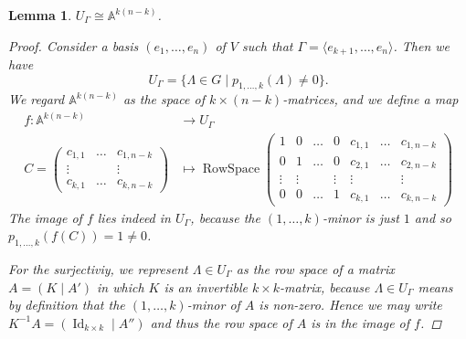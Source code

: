 \documentclass[12pt,a4paper]{amsart}
\theoremstyle{plain}
\newtheorem{lm}[thm]{Lemma}
\theoremstyle{definition}
\theoremstyle{remark}
\begin{document}
\begin{lm}
    $U_{\Gamma}\cong \mathbb{A}^{k(n-k)}$.
    \begin{proof}
	Consider a basis $(e_{1},\ldots,e_{n})$ of $V$ such that $\Gamma=\langle e_{k+1},\ldots,e_{n}\rangle$.
	Then we have
	\[ U_{\Gamma}=\{ \Lambda\in G\mid p_{1,\ldots,k}(\Lambda)\neq 0\}. \]
	We regard $\mathbb{A}^{k(n-k)}$ as the space of $k\times (n-k)$-matrices, and we define a map
	\begin{align*}
	    f\colon \mathbb{A}^{k(n-k)} & \longrightarrow U_{\Gamma} \\
	    C=\begin{pmatrix}
		c_{1,1} & \ldots & c_{1,n-k} \\
		\vdots & & \vdots \\
		c_{k,1} & \ldots & c_{k,n-k}
	    \end{pmatrix}
	    & \longmapsto \operatorname{RowSpace}\begin{pmatrix}
		1 & 0 & \ldots & 0 & c_{1,1} & \ldots & c_{1,n-k} \\
		0 & 1 & \ldots & 0 & c_{2,1} & \ldots & c_{2,n-k} \\
		\vdots & \vdots & & \vdots & \vdots & & \vdots \\
		0 & 0 & \ldots & 1 & c_{k,1} & \ldots & c_{k,n-k}
	    \end{pmatrix}
	\end{align*}
	The image of $f$ lies indeed in $U_{\Gamma}$, because the $(1,\ldots,k)$-minor is just $1$ and so $p_{1,\ldots,k}(f(C))=1\neq 0$.

	For the surjectiviy, we represent $\Lambda \in U_{\Gamma}$ as the row space of a matrix $A=(K\mid A')$ in which $K$ is an invertible $k\times k$-matrix, because $\Lambda\in U_{\Gamma}$ means by definition that the $(1,\ldots,k)$-minor of $A$ is non-zero.
	Hence we may write $K^{-1}A=(\operatorname{Id}_{k\times k}\mid A'')$ and thus the row space of $A$ is in the image of $f$.


\end{proof}
\end{lm}
\end{document}
